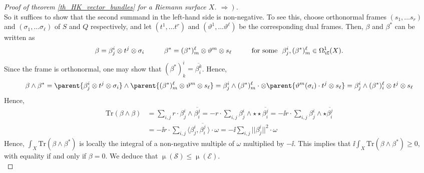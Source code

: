 \begin{proof}[\textit{Proof of theorem} \ref{th_HK_vector_bundles} \textit{for a Riemann surface} \(X\). \(\left.\Rightarrow\right)\)]
\[    \]
    So it suffices to show that the second summand in the left-hand side is non-negative. To see this, choose orthonormal frames \((s_1, \ldots s_r)\) and \((\sigma_1, \ldots \sigma_\ell)\) of \(S\) and \(Q\) respectively, and let \((t^1, \ldots t^r)\) and \((\vartheta^1, \ldots \vartheta^\ell)\) be the corresponding dual frames. Then, \(\beta\) and \(\beta^*\) can be written as
    \[
    \beta=\beta^i_j \otimes t^j \otimes \sigma_i \hspace{1 cm}
    \beta^* = (\beta^*)^\ell _m \otimes \vartheta^m \otimes s_\ell \hspace{1 cm} \text{for some } \ \beta^i_j , (\beta^*)^\ell_m \in \Omega_\C^1(X).
    \]
    Since the frame is orthonormal, one may show that \((\beta^*)^i_k =\overline{\beta^k_i}\). Hence,
    \begin{align*}
        \beta \wedge \beta^* = \parent{\beta^i_j \otimes t^j \otimes \sigma_i} \wedge \parent{(\beta^*)^\ell _m \otimes \vartheta^m \otimes s_\ell}=\beta^i_j \wedge (\beta^*)^\ell_m \cdot \otimes \parent{\vartheta^m(\sigma_i)\cdot t^j \otimes s_\ell} = \beta^i_j \wedge (\beta^*)^\ell_i \otimes t^j \otimes s_\ell
    \end{align*}
    Hence, 
    \begin{align*}
        \mathrm{Tr}(\beta \wedge \beta) & = \sum_{i,j}r\cdot  \beta^i_j \wedge\overline{\beta ^j_i} =-r \cdot \sum_{i,j}\beta ^i_j \wedge \star \star \overline{\beta^j_i}=-\ii r \cdot \sum_{i,j} \beta^i_j \wedge \star \overline{\beta^j_i} \\
        & = -\ii r \cdot \sum_{i,j} \big\langle \beta ^i_j , \overline{\beta^j_i} \  \big \rangle \cdot \omega = -\ii  \sum_{i,j} ||\beta^i_j||^2 \cdot \omega 
    \end{align*}    
    Hence, \(\int_X \mathrm{Tr}(\beta \wedge \beta^*)\) is locally the integral of a non-negative multiple of \(\omega\) multiplied by \(-\ii\). This implies that \(\ii \int_X\mathrm{Tr}(\beta \wedge \beta^*) \geq 0\), with equality if and only if \(\beta=0\). We deduce that \(\upmu(\mathcal{S}) \leq \upmu(\mathcal{E})\). \\
    

\end{proof}
